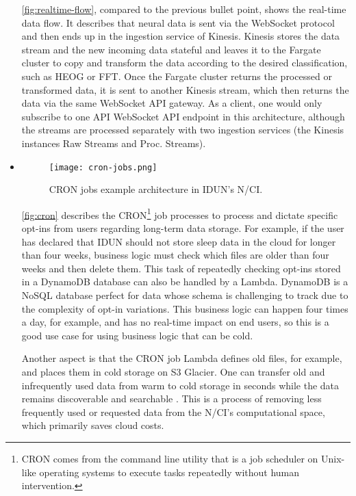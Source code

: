 \begin{itemize}
        \autoref{fig:realtime-flow}, compared to the previous bullet point, shows the real-time data flow. It describes that neural data is sent via the WebSocket protocol and then ends up in the ingestion service of Kinesis. Kinesis stores the data stream and the new incoming data stateful and leaves it to the Fargate cluster to copy and transform the data according to the desired classification, such as HEOG or FFT. Once the Fargate cluster returns the processed or transformed data, it is sent to another Kinesis stream, which then returns the data via the same WebSocket API gateway. As a client, one would only subscribe to one API WebSocket API endpoint in this architecture, although the streams are processed separately with two ingestion services (the Kinesis instances Raw Streams and Proc. Streams).

  \item \begin{figure}[!ht]
          \centering
          \hspace*{0.4in}
          \texttt{[image: cron-jobs.png]}
          \caption{CRON jobs example architecture in IDUN's N/CI.}
          \label{fig:cron}
        \end{figure}

        \autoref{fig:cron} describes the CRON\footnote{CRON comes from the command line utility that is a job scheduler on Unix-like operating systems to execute tasks repeatedly without human intervention.} job processes to process and dictate specific opt-ins from users regarding long-term data storage. For example, if the user has declared that IDUN should not store sleep data in the cloud for longer than four weeks, business logic must check which files are older than four weeks and then delete them. This task of repeatedly checking opt-ins stored in a DynamoDB database can also be handled by a Lambda. DynamoDB is a NoSQL database perfect for data whose schema is challenging to track due to the complexity of opt-in variations. This business logic can happen four times a day, for example, and has no real-time impact on end users, so this is a good use case for using business logic that can be cold.

        Another aspect is that the CRON job Lambda defines old files, for example, and places them in cold storage on S3 Glacier. One can transfer old and infrequently used data from warm to cold storage in seconds while the data remains discoverable and searchable \citep{sayed_introducing_2021}. This is a process of removing less frequently used or requested data from the N/CI’s computational space, which primarily saves cloud costs.


\end{itemize}
